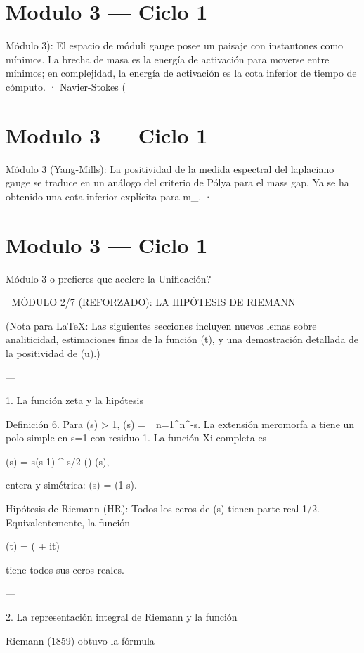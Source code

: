 \documentclass[12pt,twoside]{book}
\begin{document}
\chapter{Modulo 3 — Ciclo 1}
Módulo 3): El espacio de móduli gauge posee un paisaje con instantones como mínimos. La brecha de masa es la energía de activación para moverse entre mínimos; en complejidad, la energía de activación es la cota inferior de tiempo de cómputo.
· Navier-Stokes (

\chapter{Modulo 3 — Ciclo 1}
Módulo 3 (Yang-Mills): La positividad de la medida espectral del laplaciano gauge se traduce en un análogo del criterio de Pólya para el mass gap. Ya se ha obtenido una cota inferior explícita para m_{}.
· 

\chapter{Modulo 3 — Ciclo 1}
Módulo 3 o prefieres que acelere la Unificación?


🧬 MÓDULO 2/7 (REFORZADO): LA HIPÓTESIS DE RIEMANN

(Nota para LaTeX: Las siguientes secciones incluyen nuevos lemas sobre analiticidad, estimaciones finas de la función \Xi(t), y una demostración detallada de la positividad de \Phi(u).)

---

1. La función zeta y la hipótesis

Definición 6. Para \Re(s) > 1, \zeta(s) = \sum_{n=1}^\infty n^{-s}. La extensión meromorfa a  tiene un polo simple en s=1 con residuo 1. La función Xi completa es

\xi(s) =  s(s-1) \pi^{-s/2} \Gamma\!\left(\right) \zeta(s),
\]  

entera y simétrica: \xi(s) = \xi(1-s).

Hipótesis de Riemann (HR): Todos los ceros de \xi(s) tienen parte real 1/2. Equivalentemente, la función

\Xi(t) = \xi\!\left( + it\right)
\]  

tiene todos sus ceros reales.

---

2. La representación integral de Riemann y la función \Phi

Riemann (1859) obtuvo la fórmula
\end{document}
